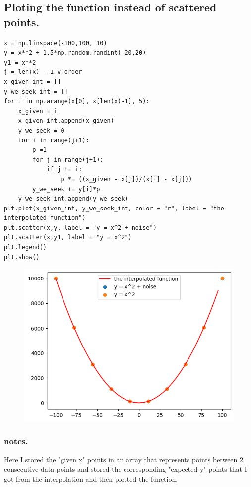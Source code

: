 \documentclass{article}
\begin{document}
\subsection{Ploting the function instead of scattered points.}
\begin{verbatim}
x = np.linspace(-100,100, 10)
y = x**2 + 1.5*np.random.randint(-20,20)
y1 = x**2
j = len(x) - 1 # order
x_given_int = []
y_we_seek_int = []
for i in np.arange(x[0], x[len(x)-1], 5):
    x_given = i
    x_given_int.append(x_given)
    y_we_seek = 0
    for i in range(j+1):
        p =1
        for j in range(j+1):
            if j != i:
                p *= ((x_given - x[j])/(x[i] - x[j]))
        y_we_seek += y[i]*p
    y_we_seek_int.append(y_we_seek)
plt.plot(x_given_int, y_we_seek_int, color = "r", label = "the interpolated function")
plt.scatter(x,y, label = "y = x^2 + noise")
plt.scatter(x,y1, label = "y = x^2")
plt.legend()
plt.show()
\end{verbatim}
\begin{figure}[H]
    \centering
\includegraphics[scale = 0.8]{HighOrderFunc.png}
\end{figure}
\subsubsection*{notes.} Here I stored the "given x" points in an array that represents points between 2 consecutive data points and stored the corresponding "expected y" points that I got from the interpolation and then plotted the function.
\end{document}
